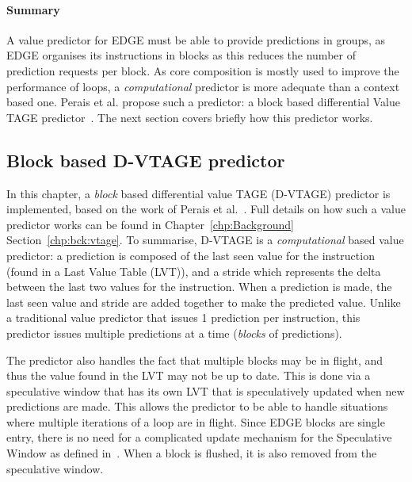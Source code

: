 \paragraph*{Summary}

A value predictor for EDGE must be able to provide predictions in groups, as EDGE organises its instructions in blocks as this reduces the number of prediction requests per block.
As core composition is mostly used to improve the performance of loops, a \textit{computational} predictor is more adequate than a context based one.
Perais et al. propose such a predictor: a block based differential Value TAGE predictor~\cite{peraisBeBop2015}.
The next section covers briefly how this predictor works.

\subsection{Block based D-VTAGE predictor}

In this chapter, a \textit{block} based differential value TAGE (D-VTAGE) predictor is implemented, based on the work of Perais et al.~\cite{peraisBeBop2015}.
Full details on how such a value predictor works can be found in Chapter~\ref{chp:Background} Section~\ref{chp:bck:vtage}.
To summarise, D-VTAGE is a \textit{computational} based value predictor: a prediction is composed of the last seen value for the instruction (found in a Last Value Table (LVT)), and a stride which represents the delta between the last two values for the instruction.
When a prediction is made, the last seen value and stride are added together to make the predicted value.
Unlike a traditional value predictor that issues 1 prediction per instruction, this predictor issues multiple predictions at a time (\textit{blocks} of predictions).

The predictor also handles the fact that multiple blocks may be in flight, and thus the value found in the LVT may not be up to date.
This is done via a speculative window that has its own LVT that is speculatively updated when new predictions are made.
This allows the predictor to be able to handle situations where multiple iterations of a loop are in flight.
Since EDGE blocks are single entry, there is no need for a complicated update mechanism for the Speculative Window as defined in~\cite{peraisBeBop2015}.
When a block is flushed, it is also removed from the speculative window.


